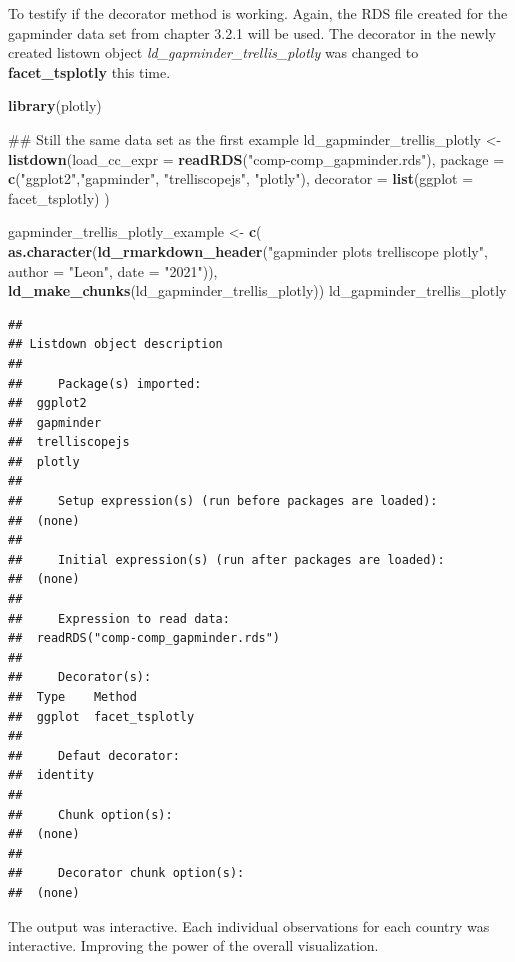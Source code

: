 \documentclass[
]{article}
\newenvironment{Shaded}{\begin{snugshade}}{\end{snugshade}}
\newcommand{\CommentTok}[1]{\textcolor[rgb]{0.54,0.53,0.53}{#1}}
\newcommand{\DataTypeTok}[1]{\textcolor[rgb]{0.00,0.34,0.68}{#1}}
\newcommand{\KeywordTok}[1]{\textcolor[rgb]{0.12,0.11,0.11}{\textbf{#1}}}
\newcommand{\NormalTok}[1]{\textcolor[rgb]{0.12,0.11,0.11}{#1}}
\newcommand{\StringTok}[1]{\textcolor[rgb]{0.75,0.01,0.01}{#1}}
\begin{document}
To testify if the decorator method is working. Again, the RDS file
created for the gapminder data set from chapter 3.2.1 will be used. The
decorator in the newly created listown object
\emph{ld\_gapminder\_trellis\_plotly} was changed to
\textbf{facet\_tsplotly} this time.

\begin{Shaded}
\begin{Highlighting}[]
\KeywordTok{library}\NormalTok{(plotly)}

\CommentTok{\#\# Still the same data set as the first example}
\NormalTok{ld\_gapminder\_trellis\_plotly \textless{}{-}}
\StringTok{  }\KeywordTok{listdown}\NormalTok{(}\DataTypeTok{load\_cc\_expr =} \KeywordTok{readRDS}\NormalTok{(}\StringTok{"comp{-}comp\_gapminder.rds"}\NormalTok{),}
                \DataTypeTok{package =} \KeywordTok{c}\NormalTok{(}\StringTok{"ggplot2"}\NormalTok{,}\StringTok{"gapminder"}\NormalTok{, }\StringTok{"trelliscopejs"}\NormalTok{, }\StringTok{"plotly"}\NormalTok{),}
              \DataTypeTok{decorator =} \KeywordTok{list}\NormalTok{(}\DataTypeTok{ggplot =}\NormalTok{ facet\_tsplotly)}
\NormalTok{)}

\NormalTok{gapminder\_trellis\_plotly\_example \textless{}{-}}\StringTok{ }\KeywordTok{c}\NormalTok{(}
 \KeywordTok{as.character}\NormalTok{(}\KeywordTok{ld\_rmarkdown\_header}\NormalTok{(}\StringTok{"gapminder plots trelliscope plotly"}\NormalTok{,}
              \DataTypeTok{author =} \StringTok{"Leon"}\NormalTok{, }\DataTypeTok{date =} \StringTok{"2021"}\NormalTok{)), }\KeywordTok{ld\_make\_chunks}\NormalTok{(ld\_gapminder\_trellis\_plotly))}
\NormalTok{ld\_gapminder\_trellis\_plotly}
\end{Highlighting}
\end{Shaded}

\begin{verbatim}
## 
## Listdown object description
## 
##     Package(s) imported:
##  ggplot2
##  gapminder
##  trelliscopejs
##  plotly
## 
##     Setup expression(s) (run before packages are loaded):
##  (none)
## 
##     Initial expression(s) (run after packages are loaded):
##  (none)
## 
##     Expression to read data:
##  readRDS("comp-comp_gapminder.rds")
## 
##     Decorator(s):
##  Type    Method
##  ggplot  facet_tsplotly
## 
##     Defaut decorator:
##  identity
## 
##     Chunk option(s):
##  (none)
## 
##     Decorator chunk option(s):
##  (none)
\end{verbatim}

The output was interactive. Each individual observations for each
country was interactive. Improving the power of the overall
visualization.
\end{document}
